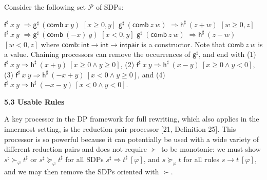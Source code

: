 \documentclass[10pt,a4paper]{amsart}
\begin{document}
Consider the following set $\mathcal{P}$ of SDPs:\par
    $\displaystyle{{\mathsf{f}^{\sharp}}\ {x}}\ {y}$ $\displaystyle\Rightarrow{\mathsf{g}^{\sharp}}\ {({{\mathsf{comb}}\ {x}}\ {y})}$ $\displaystyle[x\geq 0,y]$ $\displaystyle{\mathsf{g}^{\sharp}}\ {({{\mathsf{comb}}\ {z}}\ {w})}$ $\displaystyle\Rightarrow{\mathsf{h}^{\sharp}}\ {(z+w)}$ $\displaystyle[w\geq 0,z]$     $\displaystyle{{\mathsf{f}^{\sharp}}\ {x}}\ {y}$ $\displaystyle\Rightarrow{\mathsf{g}^{\sharp}}\ {({{\mathsf{comb}}\ {(-x)}}\ {y})}$ $\displaystyle[x<0,y]$ $\displaystyle{\mathsf{g}^{\sharp}}\ {({{\mathsf{comb}}\ {z}}\ {w})}$ $\displaystyle\Rightarrow{\mathsf{h}^{\sharp}}\ {(z-w)}$ $\displaystyle[w<0,z]$    
where $\mathsf{comb}:\mathsf{int}\rightarrow\mathsf{int}\rightarrow\mathsf{intpair}$ is a constructor. Note that ${{\mathsf{comb}}\ {z}}\ {w}$ is a value. Chaining processors can remove the occurrences of $\mathsf{g}^{\sharp}$, and end with (1) ${{{\mathsf{f}^{\sharp}}\ {x}}\ {y}}\Rightarrow{{\mathsf{h}^{\sharp}}\ {(x+y)}}\ [x\geq 0\wedge y\geq 0]$, (2) ${{{\mathsf{f}^{\sharp}}\ {x}}\ {y}}\Rightarrow{{\mathsf{h}^{\sharp}}\ {(x-y)}}\ [x\geq 0\wedge y<0]$, (3) ${{{\mathsf{f}^{\sharp}}\ {x}}\ {y}}\Rightarrow{{\mathsf{h}^{\sharp}}\ {(-x+y)}}\ [x<0\wedge y\geq 0]$, and (4) ${{{\mathsf{f}^{\sharp}}\ {x}}\ {y}}\Rightarrow{{\mathsf{h}^{\sharp}}\ {(-x-y)}}\ [x<0\wedge y<0]$.\par
 
 
 
 
 
\par\medskip\noindent\textbf{5.3 Usable Rules}\par
 
 
A key processor in the DP framework for full rewriting, which also applies in the innermost setting, is the reduction pair processor [21, Definition 25]. This processor is so powerful because it can potentially be used with a wide variety of different reduction pairs and does not require $\succ$ to be monotonic: we must show ${s^{\sharp}}\mathrel{\succ}_{\varphi}{t^{\sharp}}$ or ${s^{\sharp}}\mathrel{\succeq}_{\varphi}{t^{\sharp}}$ for all SDPs ${s^{\sharp}}\Rightarrow{t^{\sharp}}\ [\varphi]$, and ${s}\mathrel{\succeq}_{\varphi}{t}$ for all rules ${s}\rightarrow{t}\ [\varphi]$, and we may then remove the SDPs oriented with $\succ$.\par
 
\end{document}
